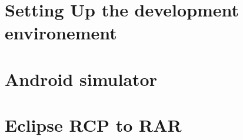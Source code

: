 \documentclass[12pt]{report}
\begin{document}
    \chapter{Setting Up the development environement}
      
      
      
    \chapter{Android simulator}

    \chapter{Eclipse RCP to RAR}

  \pagebreak
  \nocite{*}
  
  

  \pagebreak
  \printindex
\end{document}
